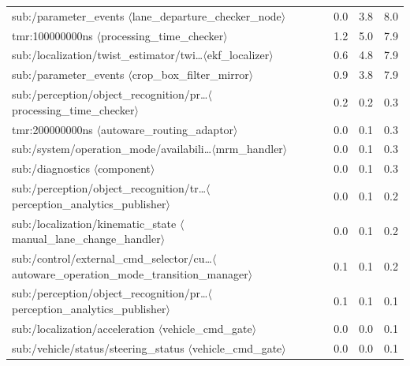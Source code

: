\begin{table}[t]
\begin{tabular}{llrrr}
sub:/parameter\_events $\langle$lane\_departure\_checker\_node$\rangle$ &  & 0.0 & 3.8 & 8.0 \\
tmr:100000000ns $\langle$processing\_time\_checker$\rangle$ &  & 1.2 & 5.0 & 7.9 \\
sub:/localization/twist\_estimator/twi\dots $\langle$ekf\_localizer$\rangle$ &  & 0.6 & 4.8 & 7.9 \\
sub:/parameter\_events $\langle$crop\_box\_filter\_mirror$\rangle$ &  & 0.9 & 3.8 & 7.9 \\
\midrule
sub:/perception/object\_recognition/pr\dots $\langle$processing\_time\_checker$\rangle$ &  & 0.2 & 0.2 & 0.3 \\
tmr:200000000ns $\langle$autoware\_routing\_adaptor$\rangle$ &  & 0.0 & 0.1 & 0.3 \\
sub:/system/operation\_mode/availabili\dots $\langle$mrm\_handler$\rangle$ &  & 0.0 & 0.1 & 0.3 \\
sub:/diagnostics $\langle$component$\rangle$ &  & 0.0 & 0.1 & 0.3 \\
sub:/perception/object\_recognition/tr\dots $\langle$perception\_analytics\_publisher$\rangle$ &  & 0.0 & 0.1 & 0.2 \\
sub:/localization/kinematic\_state $\langle$manual\_lane\_change\_handler$\rangle$ &  & 0.0 & 0.1 & 0.2 \\
sub:/control/external\_cmd\_selector/cu\dots $\langle$autoware\_operation\_mode\_transition\_manager$\rangle$ &  & 0.1 & 0.1 & 0.2 \\
sub:/perception/object\_recognition/pr\dots $\langle$perception\_analytics\_publisher$\rangle$ &  & 0.1 & 0.1 & 0.1 \\
sub:/localization/acceleration $\langle$vehicle\_cmd\_gate$\rangle$ &  & 0.0 & 0.0 & 0.1 \\
sub:/vehicle/status/steering\_status $\langle$vehicle\_cmd\_gate$\rangle$ &  & 0.0 & 0.0 & 0.1 \\
\bottomrule
\end{tabular}
\end{table}
